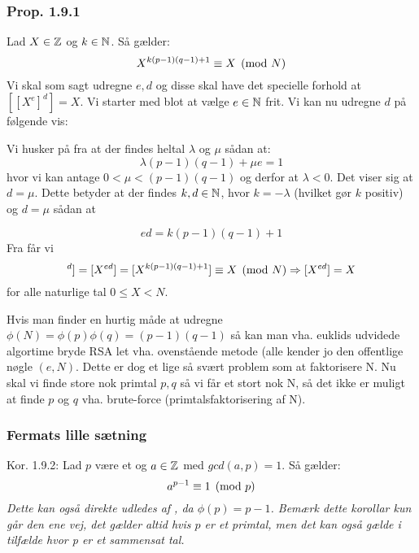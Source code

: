 \subsubsection{Prop. 1.9.1}
\label{1.9.1}
Lad $X \in \mathbb{Z}$ og $k \in \mathbb{N}$. Så gælder:
\begin{equation*}
  X^{k(p-1)(q-1) + 1} \equiv X \pmod{N}
\end{equation*}
Vi skal som sagt udregne $e, d$ og disse skal have det specielle forhold at
$[[X^e]^d] = X$. Vi starter med blot at vælge $e \in \mathbb{N}$ frit. Vi kan nu udregne
$d$ på følgende vis:

Vi husker på fra  at der findes heltal $\lambda$ og $\mu$ sådan
at:
\begin{equation*}
  \lambda (p - 1)(q - 1) + \mu e = 1
\end{equation*}
hvor vi kan antage $0 < \mu < (p - 1)(q - 1)$ og derfor at $\lambda < 0$. Det
viser sig at $d = \mu$. Dette betyder at der findes $k, d \in \mathbb{N}$, hvor $k =
-\lambda$ (hvilket gør $k$ positiv) og $d = \mu$ sådan at

\begin{equation*}
  ed = k(p - 1)(q - 1) + 1
\end{equation*}
Fra  får vi
\begin{equation*}
  [[X^e]^d] = [X^{ed}] = [X^{k(p - 1)(q - 1) + 1}] \mycong{X}{N}
  \Rightarrow [X^{ed}] = X
\end{equation*}
for alle naturlige tal $0 \leq X < N$.

Hvis man finder en hurtig måde at udregne $\phi(N) = \phi(p)\phi(q) = (p-1)
(q-1)$ så kan man vha. euklids udvidede algortime bryde RSA let vha.
ovenstående metode (alle kender jo den offentlige nøgle $(e, N)$. Dette er
dog et lige så svært problem som at faktorisere N. Nu skal vi finde store nok
primtal $p, q$ så vi får et stort nok N, så det ikke er muligt at finde $p$ og
$q$ vha. brute-force (primtalsfaktorisering af N).

\subsubsection{Fermats lille sætning}
\label{Fermats lille saetning}
Kor. 1.9.2: Lad $p$ være et  og $a \in \mathbb{Z}$ med $gcd(a,p) = 1$.
Så gælder:
\begin{equation*}
  a^{p-1} \equiv 1 \pmod{p}
\end{equation*}
\textit{Dette kan også direkte udledes af , da $\phi(p)
= p -1$. Bemærk dette korollar kun går den ene vej, det gælder altid hvis $p$
er et primtal, men det kan også gælde i tilfælde hvor p er et sammensat tal.}

